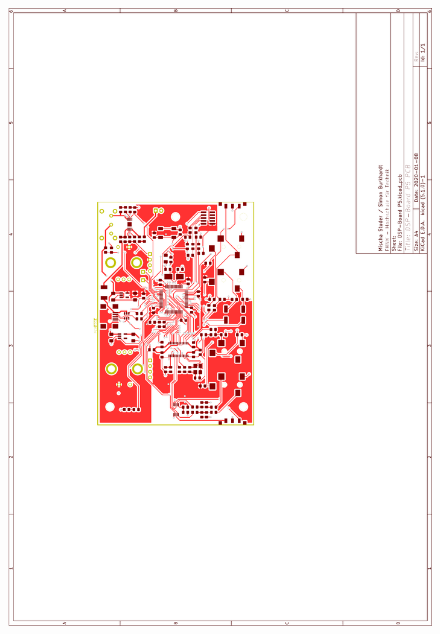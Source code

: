 \begin{appendix}
\begin{figure}[h!]
	\centering
	\includegraphics[width=0.95\linewidth]{appendix/DSP-Board-PCB-V1-1(1).pdf}
\end{figure}


\end{appendix}
